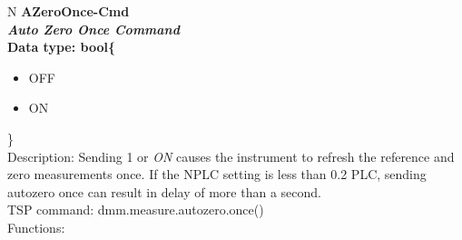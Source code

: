 \documentclass[openany]{article}
\begin{document}
		\begin{tabular}{N}
			\hline
			\bfseries AZeroOnce-Cmd\label{pv:azeroonce-cmd} \\ \hline
			\emph{Auto Zero Once Command} \\
			Data type: bool\{\begin{itemize}[noitemsep]
				\small
				\item[] OFF
				\item[] ON
			\end{itemize}\} \\
			Description: Sending 1 or \emph{ON} causes the instrument to refresh the reference and zero measurements once. If the NPLC setting is less than 0.2 PLC, sending autozero once can result in delay of more than a second. \\
			TSP command: dmm.measure.autozero.once() \\
			Functions: \\
			\arrayrulecolor{\FuncTableBorderColor}

		\end{tabular}
\end{document}
